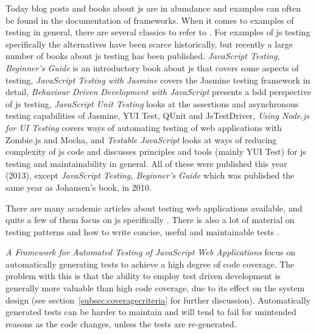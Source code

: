 \documentclass[11pt]{article}
\begin{document}
Today blog posts and books about \gls{js} are in abundance and examples can often be found in the documentation of frameworks. When it comes to examples of testing in general, there are several classics to refer to \cite{KentBeck}\cite{TestPatterns}. For examples of \gls{js} testing specifically the alternatives have been scarce historically, but recently a large number of books about \gls{js} testing has been published. \emph{JavaScript Testing, Beginner's Guide} \cite{JSBeginners} is an introductory book about \gls{js} that covers some aspects of testing, \emph{JavaScript Testing with Jasmine} \cite{JasmineBook} covers the Jasmine testing framework in detail, \emph{Behaviour Driven Development with JavaScript} \cite{BDDJS} presents a \gls{bdd} perspective of \gls{js} testing, \emph{JavaScript Unit Testing} \cite{JSUT} looks at the assertions and asynchronous testing capabilities of Jasmine, YUI Test, QUnit and JsTestDriver, \emph{Using Node.js for UI Testing} \cite{UsingNode} covers ways of automating testing of web applications with Zombie.js and Mocha, and \emph{Testable JavaScript} \cite{TestableJS} looks at ways of reducing complexity of \gls{js} code and discusses principles and tools (mainly YUI Test) for \gls{js} testing and maintainability in general. All of these were published this year (2013), except \emph{JavaScript Testing, Beginner's Guide} which was published the same year as Johansen's book, in 2010.

There are many academic articles about testing web applications available, and quite a few of them focus on \gls{js} specifically \cite{AutomatedTesting}\cite{ContractTesting}\cite{AutomatedAcceptance}\cite{Wild}\cite{DOMJavascript}. There is also a lot of material on testing patterns and how to write concise, useful and maintainable tests \cite[part~III]{TestPatterns}\cite[ch.~3-5]{BDDJS}\cite[p.~461-474]{Tddjs}\cite[p.~86-87]{TestableJS}\cite[p.~13-14]{JasmineBook}.

\emph{A Framework for Automated Testing of JavaScript Web Applications} \cite{AutomatedTesting} focus on automatically generating tests to achieve a high degree of code coverage. The problem with this is that the ability to employ test driven development is generally more valuable than high code coverage, due to its effect on the system design (see section~\ref{subsec:coveragecriteria} for further discussion). Automatically generated tests can be harder to maintain and will tend to fail for unintended reasons as the code changes, unless the tests are re-generated.
\end{document}

